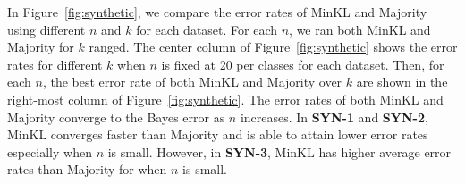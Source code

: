 \documentclass{article}
\begin{document}
In Figure~\ref{fig:synthetic}, we compare the error rates of MinKL and
Majority using different $n$ and $k$ for each dataset. For each $n$,
we ran both MinKL and Majority for $k$ ranged. The center column of
Figure~\ref{fig:synthetic} shows the error rates for different $k$
when $n$ is fixed at 20 per classes for each dataset. Then, for each
$n$, the best error rate of both MinKL and Majority over $k$ are shown
in the right-most column of Figure~\ref{fig:synthetic}. The error
rates of both MinKL and Majority converge to the Bayes error as $n$
increases. In \textbf{SYN-1} and \textbf{SYN-2}, MinKL converges
faster than Majority and is able to attain lower error rates
especially when $n$ is small. However, in \textbf{SYN-3}, MinKL has
higher average error rates than Majority for when $n$ is small.

\begin{figure}[tb]
\vskip 0.2in
\begin{center}
\centering
{}\\
\end{center}
\end{figure}
\end{document}
